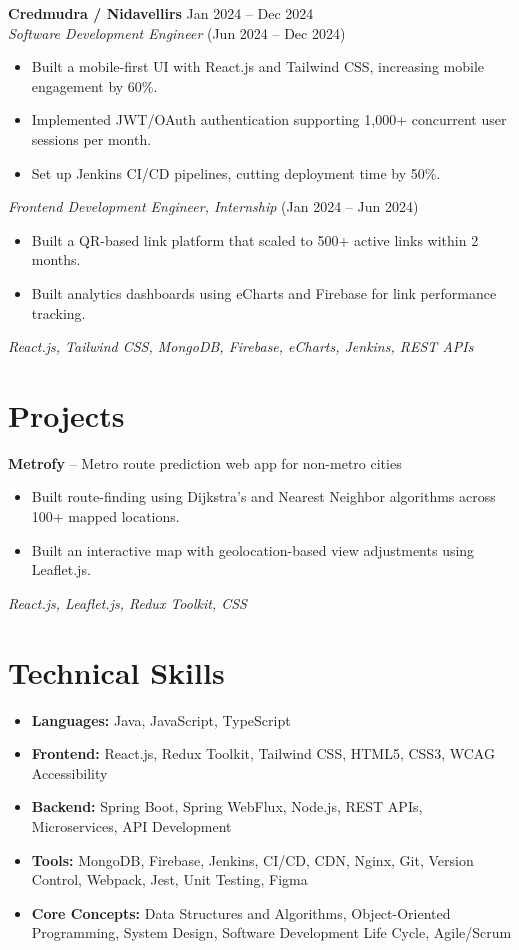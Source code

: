 \documentclass[10.5pt,letterpaper]{article}
\newcommand{\resumeItem}[1]{\item[--] #1}
\newenvironment{resumeItemize}{\begin{itemize}[leftmargin=*,itemsep=1pt,topsep=2pt,parsep=0pt]}{\end{itemize}}
\begin{document}
\vspace{4pt}
\textbf{Credmudra / Nidavellirs} \hfill Jan 2024 -- Dec 2024 \\
\textit{Software Development Engineer} (Jun 2024 -- Dec 2024)
\begin{resumeItemize}
    \resumeItem{Built a mobile-first UI with React.js and Tailwind CSS, increasing mobile engagement by 60\%.}
    \resumeItem{Implemented JWT/OAuth authentication supporting 1,000+ concurrent user sessions per month.}
    \resumeItem{Set up Jenkins CI/CD pipelines, cutting deployment time by 50\%.}
\end{resumeItemize}
\textit{Frontend Development Engineer, Internship} (Jan 2024 -- Jun 2024)
\begin{resumeItemize}
    \resumeItem{Built a QR-based link platform that scaled to 500+ active links within 2 months.}
    \resumeItem{Built analytics dashboards using eCharts and Firebase for link performance tracking.}
\end{resumeItemize}
\textit{\small React.js, Tailwind CSS, MongoDB, Firebase, eCharts, Jenkins, REST APIs}

\section*{Projects}
\textbf{Metrofy} -- Metro route prediction web app for non-metro cities
\begin{resumeItemize}
    \resumeItem{Built route-finding using Dijkstra's and Nearest Neighbor algorithms across 100+ mapped locations.}
    \resumeItem{Built an interactive map with geolocation-based view adjustments using Leaflet.js.}
\end{resumeItemize}
\textit{\small React.js, Leaflet.js, Redux Toolkit, CSS}

\section*{Technical Skills}
\begin{itemize}[leftmargin=*,itemsep=1pt,topsep=2pt,parsep=0pt]
    \item \textbf{Languages:} Java, JavaScript, TypeScript
    \item \textbf{Frontend:} React.js, Redux Toolkit, Tailwind CSS, HTML5, CSS3, WCAG Accessibility
    \item \textbf{Backend:} Spring Boot, Spring WebFlux, Node.js, REST APIs, Microservices, API Development
    \item \textbf{Tools:} MongoDB, Firebase, Jenkins, CI/CD, CDN, Nginx, Git, Version Control, Webpack, Jest, Unit Testing, Figma
    \item \textbf{Core Concepts:} Data Structures and Algorithms, Object-Oriented Programming, System Design, Software Development Life Cycle, Agile/Scrum
\end{itemize}
\end{document}
